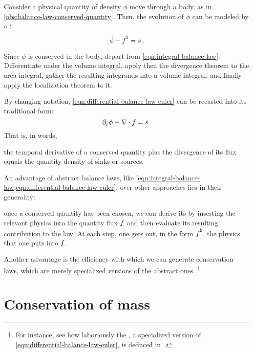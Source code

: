 \begin{model}
  Consider a physical quantity of density $\phi$ move through a body, as in \cref{obs:balance-law-conserved-quantity}. Then, the evolution of $\phi$ can be modeled by a :
  \begin{equation}\label{eqn:differential-balance-law-euler}
    \dot{\phi} + {\overline{f}}^{\natural} = s\,.
  \end{equation}
\end{model}
%
\begin{argument}
  Since $\phi$ is conserved in the body, depart from \cref{eqn:integral-balance-law}. Differentiate under the volume integral, apply then the divergence theorem to the area integral, gather the resulting integrands into a volume integral, and finally apply the localization theorem to it.
\end{argument}

By changing notation, \cref{eqn:differential-balance-law-euler} can be recasted into its traditional form:
%
\begin{equation}%
  \cpd t\phi + \odiv\flux = \ssink\,.
\end{equation}
%
That is, in words,
%
\begin{law}
  the temporal derivative of a conserved quantity plus the divergence of its flux equals the quantity density of sinks or sources.
\end{law}

An advantage of abstract balance laws, like \cref{eqn:integral-balance-law,eqn:differential-balance-law-euler}, over other approaches lies in their generality:~\cite{thorne2013,mishra2016}
%
\begin{law}
  once a conserved quantity has been chosen, we can derive its  by inserting the relevant physics into the quantity flux $f$ and then evaluate its resulting contribution to the law. At each step, one gets out, in the form ${\overline{f}}^{\natural}$, the physics that one puts into $f$.
\end{law}
%
Another advantage is the efficiency with which we can generate conservation laws, which are merely specialized versions of the abstract ones.
%
\footnote{For instance, see how laboriously the , a specialized version of \cref{eqn:differential-balance-law-euler}, is deduced in~\cite[p. 42]{holzbecher2012}.}


\section{Conservation of mass}
\label{sec:conservation-mass}

